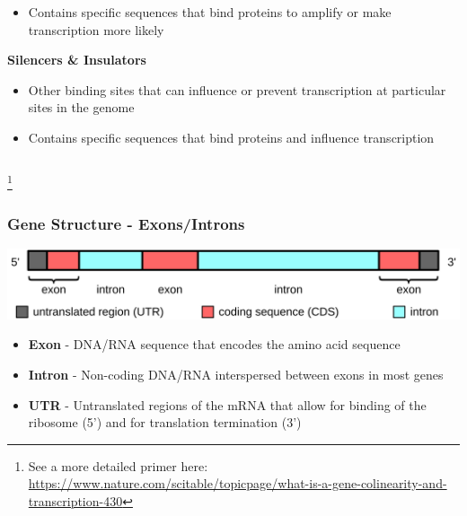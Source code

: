 \documentclass{beamer}
\newcommand\blfootnote[1]{%
	\begingroup
	\renewcommand\thefootnote{}\footnote{#1}%
	\addtocounter{footnote}{-1}%
	\endgroup
}
\begin{document}
\begin{frame}
\begin{columns}
\begin{column}{0.5\textwidth}
\begin{itemize}
				\item Contains specific sequences that bind proteins to amplify or make transcription more likely
			\end{itemize} \pause
			\textbf{Silencers \& Insulators}
			\begin{itemize}
				\item Other binding sites that can influence or prevent transcription at particular sites in the genome
				\item Contains specific sequences that bind proteins and influence transcription
			\end{itemize}
		\end{column}
	\end{columns}	
	\blfootnote{See a more detailed primer here: \url{https://www.nature.com/scitable/topicpage/what-is-a-gene-colinearity-and-transcription-430}}
	
\end{frame}


\begin{frame}
	\frametitle{Gene Structure - Exons/Introns}
	\centering	\includegraphics[keepaspectratio, width  = \textwidth]{img/geneStructureCartoon}\\ 
	\vspace{15pt}

	
	\begin{itemize}
		\item \textbf{Exon} - DNA/RNA sequence that encodes the amino acid sequence
		\item \textbf{Intron} - Non-coding DNA/RNA interspersed between exons in most genes
		\item \textbf{UTR} - Untranslated regions of the mRNA that allow for binding of the ribosome (5') and for translation termination (3')
	\end{itemize}
\end{frame}
\end{document}
